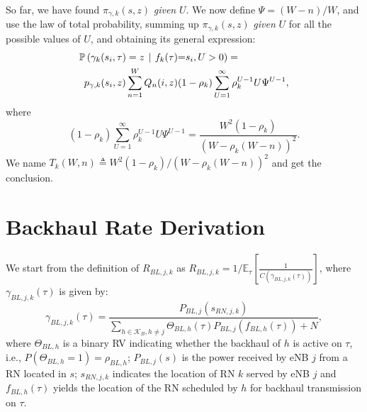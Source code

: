 \documentclass[draftcls,onecolumn]{IEEEtran}
\theoremstyle{plain}
\theoremstyle{definition}
\begin{document}
So far, we have found $\pi_{\gamma,k}(s,z)$ {\it given} $U$.
We now define $\Psi=(W-n)/W$, and use the law of total probability, summing up $\pi_{\gamma,k}(s,z)$ {\it given} $U$ for all the possible values of $U$, and obtaining its general expression:
\begin{eqnarray}
  \lefteqn{\mathbb{{P}}\left(\gamma_k(s_i,\tau) =z\hspace{4pt} \middle | \hspace{4 pt}  f_k(\tau){=}s_i, U>0 \right)=} \notag \\ 
  &&\!\!\!p_{\gamma,k}(s_i,z)  \displaystyle \sum_{n=1}^{W} Q_n(i,z) (1-\rho_k)\sum_{U=1}^{\infty} \rho_k^{U-1}  U\Psi^{U-1},
\end{eqnarray}
where
\begin{equation}
 (1-\rho_k)\sum_{U=1}^{\infty} \rho_k^{U-1}  U\Psi^{U-1}=  \frac{W^2(1-\rho_k)}{\left(W-\rho_k(W-n)\right)^2}.
\end{equation}
We name $T_k(W,n)\triangleq W^2(1-\rho_k)/ \left(W-\rho_k(W-n)\right)^2$ and get the conclusion. 




\section{Backhaul Rate Derivation}\label{appendix:back}

We start from the definition of $R_{BL,j,k}$ as 
$R_{BL,j,k}=1/\mathbb{E}_{\tau}[ \frac{1}{C( \gamma_{BL,j,k}(\tau))}]$,
where $\gamma_{BL,j,k}(\tau)$ is given by: 
\begin{equation}\label{eq:SINR_BL}
 \gamma_{BL,j,k}(\tau)=\frac{P_{BL,j}(s_{RN,j,k})}{  \sum_{h\in \mathcal{K}_B,h\neq j} \Theta_{BL,h}(\tau) P_{BL,j}(f_{BL,h}(\tau)) +N },
\end{equation}
where $\Theta_{BL,h}$ is a binary RV indicating whether the backhaul of $h$ is active on $\tau$, i.e.,  $P(\Theta_{BL,h}=1)= \rho_{BL,h}$; $P_{BL,j}(s)$ is the power received by eNB $j$ from a RN located in $s$; $s_{RN,j,k}$ indicates the location of RN $k$ served by eNB $j$ and $f_{BL,h}(\tau)$ yields the location of the RN scheduled by $h$ for backhaul transmission on $\tau$.
\end{document}
